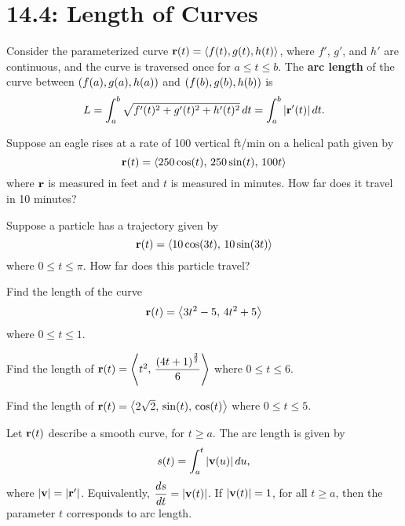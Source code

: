 \documentclass[mathNotesPreamble]{subfiles}
\begin{document}
\section{14.4: Length of Curves}
  \begin{defn*}
    Consider the parameterized curve ${\mathbf{r}}(t)={\left\langle f(t),g(t),h(t) \right\rangle}$, where $f'$, $g'$, and $h'$ are continuous, and the curve is traversed once for $a\leq t\leq b$. The \textbf{arc length} of the curve between ${\left(f(a), g(a), h(a)\right)}$ and ${\left(f(b), g(b), h(b)\right)}$ is
    \[L=\int_a^b \sqrt{f'(t)^2+g'(t)^2+h'(t)^2}\,dt=\int_a^b{\left\vert{\mathbf{r}}'(t)\right\vert}\,dt.\]
  \end{defn*}
  \begin{ex*}
    Suppose an eagle rises at a rate of 100 vertical ft/min on a helical path given by
      \[{\mathbf{r}}(t)={\left\langle 250\cos(t),\,250\sin(t),\,100t \right\rangle}\] 
    where ${\mathbf{r}}$ is measured in feet and $t$ is measured in minutes. How far does it travel in 10 minutes?
  \end{ex*}
  \pagebreak

  \begin{ex*}
    Suppose a particle has a trajectory given by 
      \[{\mathbf{r}}(t)={\left\langle 10\cos(3t),\,10\sin(3t) \right\rangle}\]
    where $0\leq t\leq \pi$. How far does this particle travel?
  \end{ex*}

  \begin{ex*}
    Find the length of the curve
      \[{\mathbf{r}}(t)={\left\langle 3t^2-5,\,4t^2+5 \right\rangle}\]
    where $0\leq t\leq 1$.
  \end{ex*}
  \pagebreak

  \begin{ex*}
    Find the length of ${\mathbf{r}}(t)={\left\langle t^2,\,\dfrac{{\left(4t+1\right)}^{\frac{3}{2}}}{6} \right\rangle}$ where $0\leq t\leq 6$.
  \end{ex*}

  \begin{ex*}
    Find the length of ${\mathbf{r}}(t)={\left\langle 2\sqrt{2},\,\sin(t),\,\cos(t) \right\rangle}$ where $0\leq t\leq 5$.
  \end{ex*}
  \pagebreak

  \begin{thmBox*}
    Let ${\mathbf{r}}(t)$ describe a smooth curve, for $t\geq a$. The arc length is given by 
      \[s(t)=\int_a^t {\left\vert{\mathbf{v}}(u)\right\vert}\,du,\]
    where ${\left\vert{\mathbf{v}}\right\vert}={\left\vert{\mathbf{r}}'\right\vert}$. Equivalently, $\displaystyle \frac{ds}{dt}={\left\vert{\mathbf{v}}(t)\right\vert}$. If ${\left\vert{\mathbf{v}}(t)\right\vert}=1$, for all $t\geq a$, then the parameter $t$ corresponds to arc length.
  \end{thmBox*}
\end{document}
